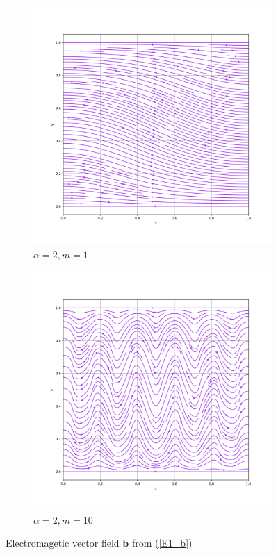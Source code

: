\documentclass[12pt,a4paper]{article}
\begin{document}
\begin{figure}[H]
 \begin{subfigure}{0.5\textwidth}
     \includegraphics[width=\textwidth]{Pics/VectorField/E1b_a2_m1.png}
     \caption{$\alpha=2, m=1$}
 \end{subfigure}
   \begin{subfigure}{0.5\textwidth}
     \includegraphics[width=\textwidth]{Pics/VectorField/E1b_a2_m10.png}
     \caption{$\alpha=2, m=10$}
 \end{subfigure}
 \caption{Electromagetic vector field $\mathbf{b}$ from (\ref{E1_b})} \label{E1_VFs}
\end{figure}
\end{document}
